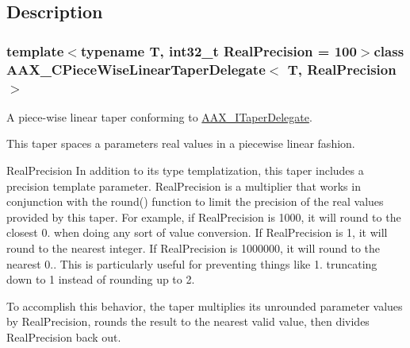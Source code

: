 \subsection{Description}
\subsubsection*{template$<$typename T, int32\+\_\+t Real\+Precision = 100$>$class A\+A\+X\+\_\+\+C\+Piece\+Wise\+Linear\+Taper\+Delegate$<$ T, Real\+Precision $>$}

A piece-\/wise linear taper conforming to \hyperlink{a00114}{A\+A\+X\+\_\+\+I\+Taper\+Delegate}. 

This taper spaces a parameter\textquotesingle{}s real values in a piecewise linear fashion.

\begin{DoxyParagraph}{Real\+Precision}
In addition to its type templatization, this taper includes a precision template parameter. Real\+Precision is a multiplier that works in conjunction with the round() function to limit the precision of the real values provided by this taper. For example, if Real\+Precision is 1000, it will round to the closest 0. when doing any sort of value conversion. If Real\+Precision is 1, it will round to the nearest integer. If Real\+Precision is 1000000, it will round to the nearest 0.. This is particularly useful for preventing things like 1. truncating down to 1 instead of rounding up to 2.
\end{DoxyParagraph}
To accomplish this behavior, the taper multiplies its unrounded parameter values by Real\+Precision, rounds the result to the nearest valid value, then divides Real\+Precision back out.

